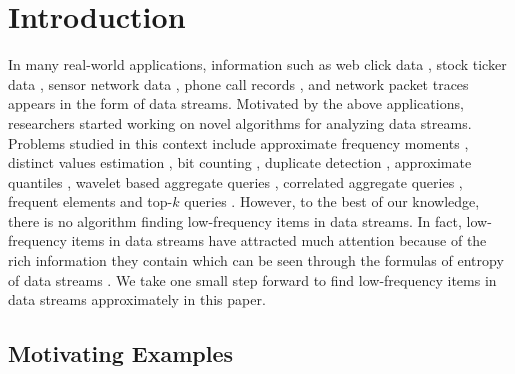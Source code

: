 \documentclass[conference]{IEEEtran}
\begin{document}
\section{Introduction}
In many real-world applications, information such as web click data \cite{IEEEexample:webdata}, stock ticker
data \cite{IEEEexample:stockticker,IEEEexample:stockticker2}, sensor network data \cite{IEEEexample:sensor}, phone call records \cite{IEEEexample:phonecall}, and network packet traces \cite{IEEEexample:packet} appears in the form of data streams. Motivated by the above applications, researchers started working on novel algorithms for analyzing data streams. Problems studied in this context include approximate frequency moments \cite{IEEEexample:frequencymoments}, distinct values estimation \cite{IEEEexample:distinctestimation,IEEEexample:distinctvalues}, bit counting \cite{IEEEexample:bitcounting}, duplicate detection \cite{IEEEexample:sbf,IEEEexample:duplicatedetec}, approximate quantiles \cite{IEEEexample:quantile}, wavelet based aggregate queries \cite{IEEEexample:wavelet}, correlated aggregate queries \cite{IEEEexample:correlated}, frequent elements \cite{IEEEexample:frequent1,IEEEexample:frequent2,IEEEexample:frequent3,IEEEexample:ldsketch} and top-$k$ queries \cite{IEEEexample:spacesaving,IEEEexample:top-k1}. However, to the best of our knowledge, there is no algorithm finding low-frequency items in data streams. In fact, low-frequency items in data streams have attracted much attention because of the rich information they contain which can be seen through the formulas of entropy of data streams \cite{IEEEexample:metropy}. We take one small step forward to find low-frequency items in data streams approximately in this paper.   

\subsection{Motivating Examples}
\end{document}
